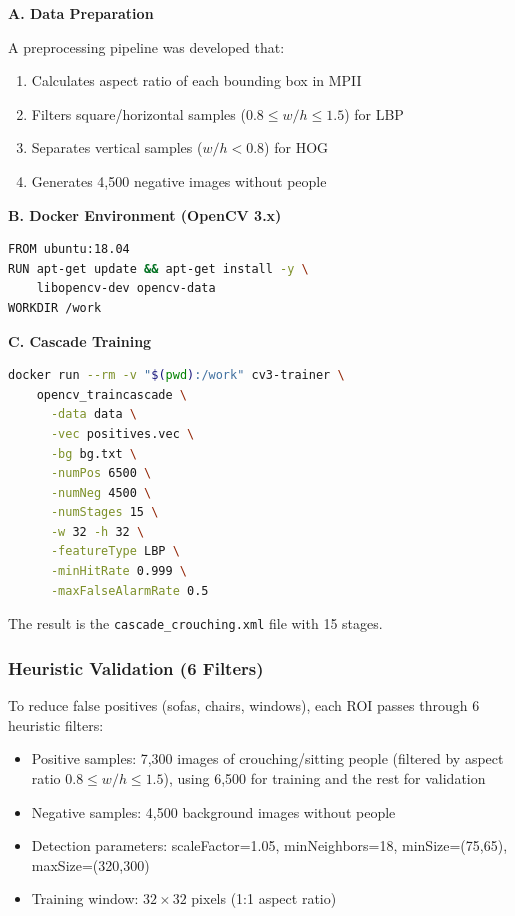 \documentclass[conference]{IEEEtran}
\begin{document}
\textbf{A. Data Preparation}

A preprocessing pipeline was developed that:
\begin{enumerate}
    \item Calculates aspect ratio of each bounding box in MPII
    \item Filters square/horizontal samples ($0.8 \leq w/h \leq 1.5$) for LBP
    \item Separates vertical samples ($w/h < 0.8$) for HOG
    \item Generates 4,500 negative images without people
\end{enumerate}

\textbf{B. Docker Environment (OpenCV 3.x)}

\begin{lstlisting}[caption={Dockerfile for training},label={lst:dockerfile},language=bash]
FROM ubuntu:18.04
RUN apt-get update && apt-get install -y \
    libopencv-dev opencv-data
WORKDIR /work
\end{lstlisting}

\textbf{C. Cascade Training}

\begin{lstlisting}[caption={LBP training command},label={lst:traincmd},language=bash]
docker run --rm -v "$(pwd):/work" cv3-trainer \
    opencv_traincascade \
      -data data \
      -vec positives.vec \
      -bg bg.txt \
      -numPos 6500 \
      -numNeg 4500 \
      -numStages 15 \
      -w 32 -h 32 \
      -featureType LBP \
      -minHitRate 0.999 \
      -maxFalseAlarmRate 0.5
\end{lstlisting}

The result is the \texttt{cascade\_crouching.xml} file with 15 stages.

\subsubsection{Heuristic Validation (6 Filters)}

To reduce false positives (sofas, chairs, windows), each ROI passes through 6 heuristic filters:

\begin{itemize}
    \item Positive samples: 7,300 images of crouching/sitting people (filtered by aspect ratio $0.8 \leq w/h \leq 1.5$), using 6,500 for training and the rest for validation
    \item Negative samples: 4,500 background images without people
    \item Detection parameters: scaleFactor=1.05, minNeighbors=18, minSize=(75,65), maxSize=(320,300)
    \item Training window: $32 \times 32$ pixels (1:1 aspect ratio)
\end{itemize}
\end{document}

